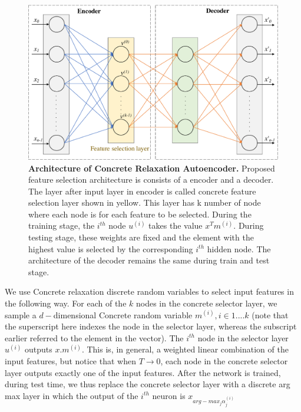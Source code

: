 \documentclass{bioinfo}
\begin{document}
\begin{figure}[hbt]
    \centering
    \includegraphics[scale=0.5]{fig/architecture.pdf}
    \caption{\textbf{Architecture of Concrete Relaxation Autoencoder.} Proposed feature selection architecture is consists of a encoder and a decoder. The layer after input layer in encoder is called concrete feature selection layer shown in yellow. This layer has k number of node where each node is for each feature to be selected. During the training stage, the $i^{th}$ node $u^{(i)}$ takes the value $x^Tm^{(i)}$.
During testing stage, these weights are fixed and the element with the highest value is selected by the corresponding $i^{th}$ hidden node.
The architecture of the decoder remains the same during train and test stage.}
    \label{fig:architecture}
\end{figure}


We use Concrete relaxation discrete random variables to select input features in
the following way. For each of the $k$ nodes in the concrete
selector layer, we sample a $d-$dimensional Concrete random
variable $m^{(i)}, i \in { 1....k}$ (note that the superscript here
indexes the node in the selector layer, whereas the subscript
earlier referred to the element in the vector). The $i^{th}$ node in
the selector layer $u^{(i)}$ outputs $x . m^{(i)}$. This is, in general, a
weighted linear combination of the input features, but notice
that when $T \to 0$, each node in the concrete selector layer
outputs exactly one of the input features. After the network
is trained, during test time, we thus replace the concrete
selector layer with a discrete arg max layer in which the
output of the $i^{th}$ neuron is $x_{arg-max_j \alpha _j ^(i)}$

\end{document}
